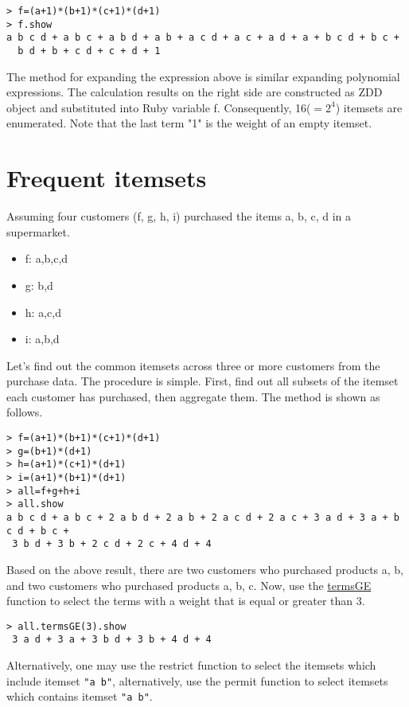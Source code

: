 \begin{Verbatim}[baselinestretch=0.7,frame=single]
> f=(a+1)*(b+1)*(c+1)*(d+1)
> f.show
a b c d + a b c + a b d + a b + a c d + a c + a d + a + b c d + b c +
  b d + b + c d + c + d + 1
\end{Verbatim}

The method for expanding the expression above is similar expanding polynomial expressions. The calculation results on the right side are constructed as ZDD object and substituted into Ruby variable f.
Consequently, 16($=2^4$) itemsets are enumerated. Note that the last term "1" is the weight of an empty itemset.

\section{Frequent itemsets}
Assuming four customers (f, g, h, i) purchased the items a, b, c, d in a supermarket.

\begin{itemize}
\item f: a,b,c,d
\item g: b,d
\item h: a,c,d
\item i: a,b,d
\end{itemize}
Let's find out the common itemsets across three or more customers from the purchase data. The procedure is simple. 
First, find out all subsets of the itemset each customer has purchased, then aggregate them. The method is shown as follows.

\begin{Verbatim}[baselinestretch=0.7,frame=single]
> f=(a+1)*(b+1)*(c+1)*(d+1)
> g=(b+1)*(d+1)
> h=(a+1)*(c+1)*(d+1)
> i=(a+1)*(b+1)*(d+1)
> all=f+g+h+i
> all.show
a b c d + a b c + 2 a b d + 2 a b + 2 a c d + 2 a c + 3 a d + 3 a + b c d + b c +
 3 b d + 3 b + 2 c d + 2 c + 4 d + 4  
\end{Verbatim}

Based on the above result, there are two customers who purchased products a, b, and  two customers who purchased products a, b, c. Now, use the \hyperref[sect:termsGE]{termsGE} function to select the terms with a weight that is equal or greater than 3.

\begin{Verbatim}[baselinestretch=0.7,frame=single]
> all.termsGE(3).show
 3 a d + 3 a + 3 b d + 3 b + 4 d + 4
\end{Verbatim}

Alternatively, one may use the restrict function to select the itemsets which include  itemset \verb|"a b"|, alternatively, use the permit function to select itemsets which contains  itemset \verb|"a b"|.

